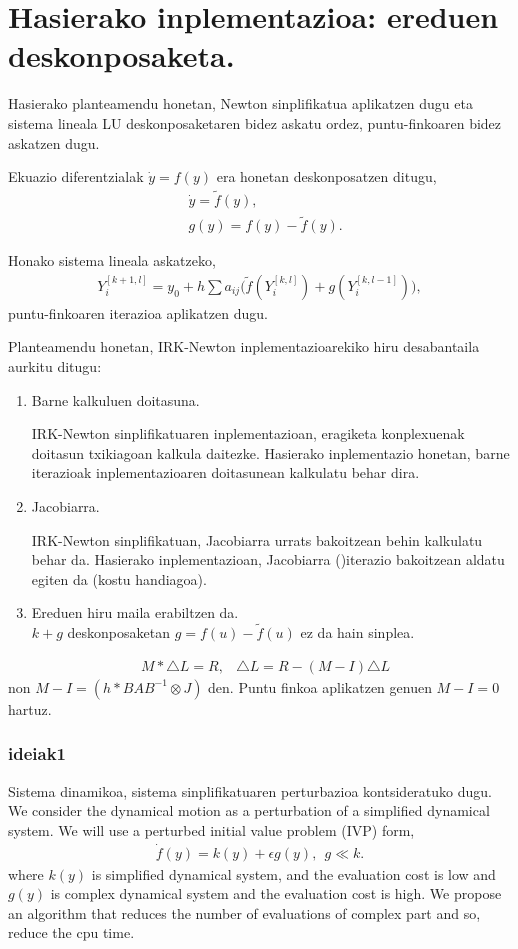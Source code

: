 \section{Hasierako inplementazioa: ereduen deskonposaketa.}


Hasierako planteamendu honetan,  Newton sinplifikatua aplikatzen dugu eta  sistema lineala LU deskonposaketaren bidez askatu ordez, puntu-finkoaren bidez askatzen dugu.

Ekuazio diferentzialak $\dot{y}=f(y)$ era honetan deskonposatzen ditugu,
\begin{align*}
&\dot{y}=\tilde{f}(y),\\
&g(y)=f(y)-\tilde{f}(y).
\end{align*}

Honako sistema lineala askatzeko,
\begin{align*}
Y_i^{[k+1,l]}=y_0+ h \sum a_{ij} \big( \tilde{f}(Y_i^{[k,l]})+g(Y_i^{[k,l-1]})),
\end{align*}
puntu-finkoaren iterazioa aplikatzen dugu.

Planteamendu honetan, IRK-Newton inplementazioarekiko hiru desabantaila aurkitu ditugu: 
\begin{enumerate}
\item Barne kalkuluen doitasuna. 

IRK-Newton sinplifikatuaren inplementazioan, eragiketa konplexuenak doitasun txikiagoan kalkula daitezke. Hasierako inplementazio honetan, barne iterazioak inplementazioaren doitasunean kalkulatu behar dira.

\item Jacobiarra.

IRK-Newton sinplifikatuan, Jacobiarra urrats bakoitzean behin kalkulatu behar da. Hasierako inplementazioan, Jacobiarra ()iterazio bakoitzean  aldatu egiten da (kostu handiagoa).
\item Ereduen hiru maila erabiltzen da.\\
$k+g$ deskonposaketan $g=f(u)-\tilde{f}(u)$ ez da hain sinplea. 
\end{enumerate}

\begin{align*}
&M*\triangle L=R,
&\triangle L=R-(M-I) \triangle L
\end{align*}
non $M-I=(h*BAB^{-1}\otimes J)$ den. Puntu finkoa aplikatzen genuen $M-I=0$ hartuz.

\subsubsection*{ideiak1}
Sistema dinamikoa, sistema sinplifikatuaren perturbazioa kontsideratuko dugu.  
 We consider the dynamical motion as a perturbation of a simplified dynamical system.  We will use a perturbed initial value problem (IVP) form,
 \begin{align*}
 \dot f(y)=  k(y) + \epsilon g (y), \ \ g\ll k.   
 \end{align*}
 where $k(y)$ is simplified dynamical system, and the evaluation cost is low and
$g(y)$ is complex dynamical system  and  the evaluation cost is high. We propose an algorithm that reduces the number of evaluations of complex part  and so, reduce the cpu time. 


